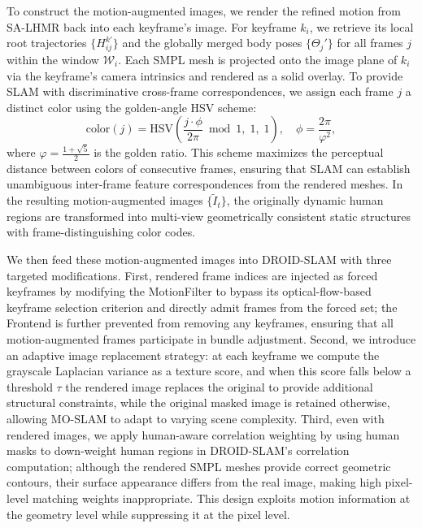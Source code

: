 To construct the motion-augmented images, we render the refined motion from SA-LHMR back into each keyframe's image. For keyframe $k_i$, we retrieve its local root trajectories $\{H_{ij}^{k'}\}$ and the globally merged body poses $\{\Theta_j'\}$ for all frames $j$ within the window $\mathcal{W}_i$. Each SMPL mesh is projected onto the image plane of $k_i$ via the keyframe's camera intrinsics and rendered as a solid overlay. To provide SLAM with discriminative cross-frame correspondences, we assign each frame $j$ a distinct color using the golden-angle HSV scheme:
%
\begin{equation}
  \text{color}(j) = \text{HSV}\!\left(\frac{j \cdot \phi}{2\pi} \bmod 1,\; 1,\; 1\right), \quad \phi = \frac{2\pi}{\varphi^2},
\end{equation}
%
where $\varphi = \frac{1+\sqrt{5}}{2}$ is the golden ratio. This scheme maximizes the perceptual distance between colors of consecutive frames, ensuring that SLAM can establish unambiguous inter-frame feature correspondences from the rendered meshes. In the resulting motion-augmented images $\{\tilde{I}_t\}$, the originally dynamic human regions are transformed into multi-view geometrically consistent static structures with frame-distinguishing color codes.

We then feed these motion-augmented images into DROID-SLAM with three targeted modifications. First, rendered frame indices are injected as forced keyframes by modifying the MotionFilter to bypass its optical-flow-based keyframe selection criterion and directly admit frames from the forced set; the Frontend is further prevented from removing any keyframes, ensuring that all motion-augmented frames participate in bundle adjustment. Second, we introduce an adaptive image replacement strategy: at each keyframe we compute the grayscale Laplacian variance as a texture score, and when this score falls below a threshold $\tau$ the rendered image replaces the original to provide additional structural constraints, while the original masked image is retained otherwise, allowing MO-SLAM to adapt to varying scene complexity. Third, even with rendered images, we apply human-aware correlation weighting by using human masks to down-weight human regions in DROID-SLAM's correlation computation; although the rendered SMPL meshes provide correct geometric contours, their surface appearance differs from the real image, making high pixel-level matching weights inappropriate. This design exploits motion information at the geometry level while suppressing it at the pixel level.


